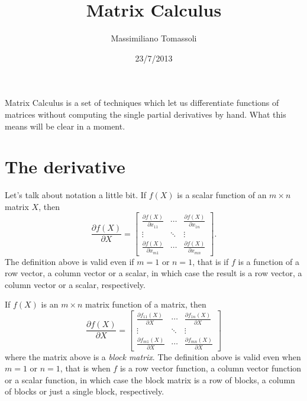 \documentclass[a4paper,12pt]{article}
\title{Matrix Calculus}
\author{Massimiliano Tomassoli}
\date{23/7/2013}
\begin{document}
\maketitle

Matrix Calculus is a set of techniques which let us differentiate functions of matrices without computing the single partial derivatives by hand. What this means will be clear in a moment.

\section{The derivative}

Let's talk about notation a little bit.
If $f(X)$ is a scalar function of an $m\times n$ matrix $X$, then
$$
\frac{\partial f(X)}{\partial X} =
\begin{bmatrix}
\frac{\partial f(X)}{\partial x_{11}} & \cdots & \frac{\partial f(X)}{\partial x_{1n}} \\
\vdots & \ddots & \vdots \\
\frac{\partial f(X)}{\partial x_{m1}} & \cdots & \frac{\partial f(X)}{\partial x_{mn}}
\end{bmatrix}.
$$ The definition above is valid even if $m=1$ or $n=1$, that is if $f$ is a function of a row vector, a column vector or a scalar, in which case the result is a row vector, a column vector or a scalar, respectively.

If $f(X)$ is an $m\times n$ matrix function of a matrix, then
$$
\frac{\partial f(X)}{\partial X} =
\begin{bmatrix}
\frac{\partial f_{11}(X)}{\partial X} & \cdots & \frac{\partial f_{1n}(X)}{\partial X} \\
\vdots & \ddots & \vdots \\
\frac{\partial f_{m1}(X)}{\partial X} & \cdots & \frac{\partial f_{mn}(X)}{\partial X}
\end{bmatrix}
$$ where the matrix above is a \emph{block matrix}. The definition above is valid even when $m=1$ or $n=1$, that is when $f$ is a row vector function, a column vector function or a scalar function, in which case the block matrix is a row of blocks, a column of blocks or just a single block, respectively.
\end{document}
